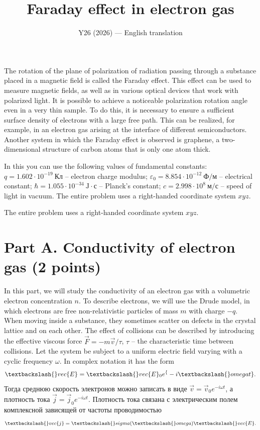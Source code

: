 \documentclass[11pt,a4paper]{article}
\title{\textbf{Faraday effect in electron gas}}
\author{\normalsize Y26 (2026) --- English translation}
\date{}
\begin{document}
\maketitle

The rotation of the plane of polarization of radiation passing through a substance placed in a magnetic field is called the Faraday effect. This effect can be used to measure magnetic fields, as well as in various optical devices that work with polarized light. It is possible to achieve a noticeable polarization rotation angle even in a very thin sample. To do this, it is necessary to ensure a sufficient surface density of electrons with a large free path. This can be realized, for example, in an electron gas arising at the interface of different semiconductors. Another system in which the Faraday effect is observed is graphene, a two-dimensional structure of carbon atoms that is only one atom thick.

In this you can use the following values ​​of fundamental constants: $q = 1.602 \cdot 10^{-19}~\text{Кл}$ – electron charge modulus; $\varepsilon_0 = 8.854 \cdot 10^{-12} ~\text{Ф}/\text{м}$ – electrical constant; $\hbar =1.055 \cdot 10^{-34} ~\text{J} \cdot {с}$ – Planck’s constant; $c =2.998 \cdot 10^{8} ~\text{м}/\text{с} $ – speed of light in vacuum. The entire problem uses a right-handed coordinate system $xyz$.

The entire problem uses a right-handed coordinate system $xyz$.

\section*{Part A. Conductivity of electron gas (2 points)}

In this part, we will study the conductivity of an electron gas with a volumetric electron concentration $n$. To describe electrons, we will use the Drude model, in which electrons are free non-relativistic particles of mass $m$ with charge $-q$. When moving inside a substance, they sometimes scatter on defects in the crystal lattice and on each other. The effect of collisions can be described by introducing the effective viscous force $\vec{F} = - m \vec{v}/\tau$, $\tau$ – the characteristic time between collisions. Let the system be subject to a uniform electric field varying with a cyclic frequency $\omega$. In complex notation it has the form $$ \textbackslash\{\}vec\{E\} = \textbackslash\{\}vec\{E\}_0 e^\{-i\textbackslash\{\}omega t\}. $$Тогда среднюю скорость электронов можно записать в виде $\vec{v} = \vec{v}_0 e^{-i \omega t}$, а плотность тока $\vec{j} = \vec{j}_0 e^{-i \omega t}$. Плотность тока связана с  электрическим полем комплексной зависящей от частоты проводимостью $$ \textbackslash\{\}vec\{j\} = \textbackslash\{\}sigma(\textbackslash\{\}omega) \textbackslash\{\}vec\{E\}. $$
\end{document}
